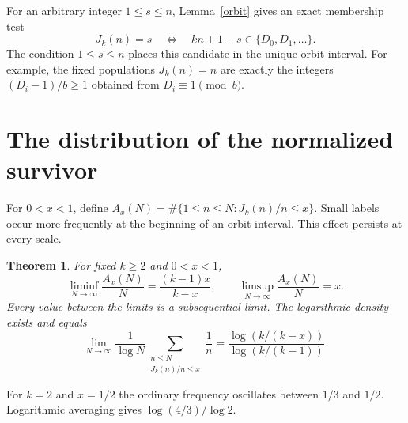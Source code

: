 \documentclass[11pt]{article}
\newtheorem{theorem}{Theorem}[section]
\begin{document}
For an arbitrary integer $1\le s\le n$, Lemma~\ref{orbit} gives an exact membership test
\[
 J_k(n)=s\quad\Longleftrightarrow\quad kn+1-s\in\{D_0,D_1,\ldots\}.
\]
The condition $1\le s\le n$ places this candidate in the unique orbit interval. For example, the fixed populations $J_k(n)=n$ are exactly the integers $(D_i-1)/b\ge1$ obtained from $D_i\equiv1\pmod b$.

\section{The distribution of the normalized survivor}
For $0<x<1$, define $A_x(N)=\#\{1\le n\le N:J_k(n)/n\le x\}$. Small labels occur more frequently at the beginning of an orbit interval. This effect persists at every scale.
\begin{theorem}\label{dist}
For fixed $k\ge2$ and $0<x<1$,
\[
 \liminf_{N\to\infty}\frac{A_x(N)}{N}=\frac{(k-1)x}{k-x},
 \qquad
 \limsup_{N\to\infty}\frac{A_x(N)}{N}=x .
\]
Every value between the limits is a subsequential limit. The logarithmic density exists and equals
\[
 \lim_{N\to\infty}\frac{1}{\log N}
   \sum_{\substack{n\le N\\ J_k(n)/n\le x}}\frac1n
 =\frac{\log(k/(k-x))}{\log(k/(k-1))}.
\]
\end{theorem}
For $k=2$ and $x=1/2$ the ordinary frequency oscillates between $1/3$ and $1/2$. Logarithmic averaging gives $\log(4/3)/\log2$.
\end{document}
